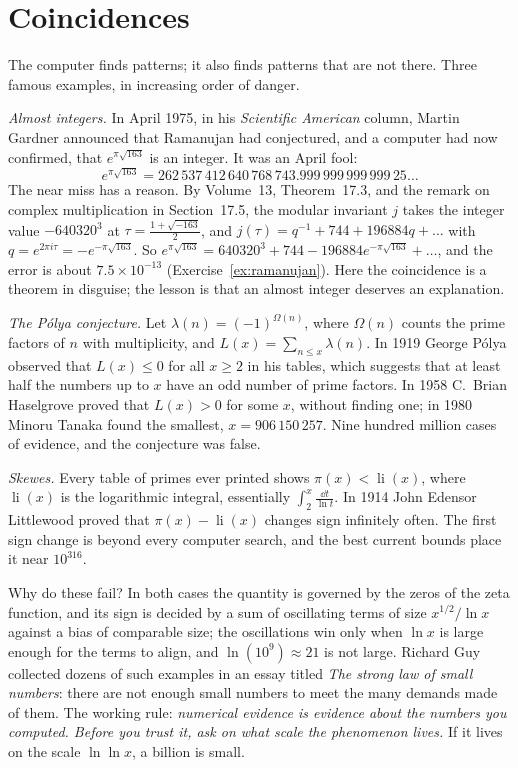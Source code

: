 \section{Coincidences}

The computer finds patterns; it also finds patterns that are not there. Three famous examples, in increasing order of danger.

\emph{Almost integers.} In April 1975, in his \emph{Scientific American} column, Martin Gardner announced that Ramanujan had conjectured, and a computer had now
confirmed, that $e^{\pi\sqrt{163}}$ is an integer. It was an April fool:
\[
e^{\pi\sqrt{163}}=262\,537\,412\,640\,768\,743.999\,999\,999\,999\,25\dots
\]
The near miss has a reason. By Volume~13, Theorem~17.3, and the remark on complex multiplication in Section~17.5, the modular invariant $j$ takes the integer value $-640320^3$ at $\tau=\frac{1+\sqrt{-163}}2$, and $j(\tau)=q^{-1}+744+196884q+\dots$
with $q=e^{2\pi i\tau}=-e^{-\pi\sqrt{163}}$. So $e^{\pi\sqrt{163}}=640320^3+744-196884e^{-\pi\sqrt{163}}+\dots$, and the error is about $7.5\times10^{-13}$ (Exercise~\ref{ex:ramanujan}). Here the coincidence is a theorem in
disguise; the lesson is that an almost integer deserves an explanation.

\emph{The Pólya conjecture.} Let $\lambda(n)=(-1)^{\Omega(n)}$, where $\Omega(n)$ counts the prime factors of $n$ with multiplicity, and $L(x)=\sum_{n\le x}\lambda(n)$. In 1919 George Pólya
observed that $L(x)\le0$ for all $x\ge2$ in his tables, which suggests that at least half the numbers up to $x$ have an odd number of prime factors. In 1958 C.~Brian Haselgrove proved that
$L(x)>0$ for some $x$, without finding one; in 1980 Minoru Tanaka found the smallest, $x=906\,150\,257$. Nine hundred million cases of evidence, and the conjecture was false.

\emph{Skewes.} Every table of primes ever printed shows $\pi(x)<\operatorname{li}(x)$, where $\operatorname{li}(x)$ is the logarithmic integral, essentially $\int_2^x\frac{\dd t}{\ln t}$. In 1914
John Edensor Littlewood proved that $\pi(x)-\operatorname{li}(x)$ changes sign infinitely often. The first sign change is beyond every computer search, and the best
current bounds place it near $10^{316}$.

Why do these fail? In both cases the quantity is governed by the zeros of the zeta function, and its sign is decided by a sum of oscillating terms of size
$x^{1/2}/\ln x$ against a bias of comparable size; the oscillations win only when $\ln x$ is large enough for the terms to align, and $\ln(10^9)\approx21$ is not large.
Richard Guy collected dozens of such examples in an essay titled \emph{The strong law of small numbers}: there are not enough small numbers to meet the many demands
made of them. The working rule: \emph{numerical evidence is evidence about the numbers you computed. Before you trust it, ask on what scale the phenomenon lives.} If it
lives on the scale $\ln\ln x$, a billion is small.

